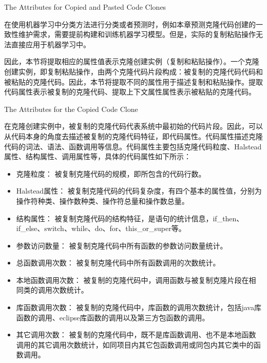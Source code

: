 {The Attributes for Copied and Pasted Code Clones}
\label{lab-creatingattribute}

在使用机器学习中分类方法进行分类或者预测时，例如本章预测克隆代码创建的一致性维护需求，需要提前构建和训练机器学习模型。但是，实际的复制粘贴操作无法直接应用于机器学习中。

因此，本节将提取相应的属性值表示克隆创建实例（复制和粘贴操作）。一个克隆创建实例，即复制粘贴操作，由两个克隆代码片段构成：被复制的克隆代码代码和被粘贴的克隆代码。因此，本节将提取不同的属性用于描述复制和粘贴操作。提取代码属性表示被复制的克隆代码、提取上下文属性属性表示被粘贴的克隆代码。

{The Attributes for the Copied Code Clone}

在克隆创建实例中，被复制的克隆代码代表系统中最初始的代码片段。因此，可以从代码本身的角度去描述被复制的克隆代码特征，即代码属性。代码属性描述克隆代码的词法、语法、函数调用等信息。代码属性主要包括克隆代码粒度、Halstead属性、结构属性、调用属性等，具体的代码属性如下所示：

\begin{itemize}
\item 
克隆粒度：
被复制克隆代码的规模，即所包含的代码行数。
\item 
Halstead属性：
被复制克隆代码的代码复杂度，有四个基本的属性值，分别为操作符种类、操作数种类、操作符总量和操作数总量。
\item  
结构属性：
被复制克隆代码的结构特征，是语句的统计信息，{if\_then、if\_else、switch、while、do、for、this\_or\_super}等。
\item  
参数访问数量：
被复制克隆代码中所有函数的参数访问数量统计。
\item  
总函数调用次数：
被复制克隆代码中所有函数调用的次数统计。
\item  
本地函数调用次数：
被复制的克隆代码中，调用函数与被复制克隆片段在相同类的调用次数统计。
\item  
库函数调用次数：
被复制的克隆代码中，库函数的调用次数统计，包括java库函数的调用、eclipse库函数的调用以及第三方包函数的调用。
\item  
其它调用次数：
被复制的克隆代码中，既不是库函数调用、也不是本地函数调用的其它调用次数统计，如同项目内其它包函数调用或同包内其它类中的函数调用。
\end{itemize}

